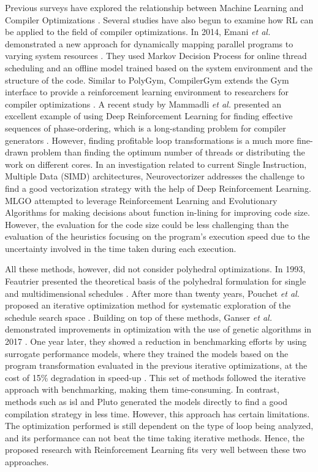 \documentclass[logo,msc]{infthesis}           %
\begin{document}
Previous surveys have explored the relationship between Machine Learning and Compiler Optimizations \cite{8357388}\cite{9232934}. Several studies have also begun to examine how RL can be applied to the field of compiler optimizations. In 2014, Emani \textit{et al.} demonstrated a new approach for dynamically mapping parallel programs to varying system resources \cite{10.1007}. They used Markov Decision Process for online thread scheduling and an offline model trained based on the system environment and the structure of the code. Similar to PolyGym, CompilerGym extends the Gym interface to provide a reinforcement learning environment to researchers for compiler optimizations \cite{CompilerGym}. A recent study by Mammadli \textit{et al.} presented an excellent example of using Deep Reinforcement Learning for finding effective sequences of phase-ordering, which is a long-standing problem for compiler generators \cite{static.neural}. However, finding profitable loop transformations is a much more fine-drawn problem than finding the optimum number of threads or distributing the work on different cores. In an investigation related to current Single Instruction, Multiple Data (SIMD) architectures, Neurovectorizer \cite{NeuroVectorizer} addresses the challenge to find a good vectorization strategy with the help of Deep Reinforcement Learning. MLGO \cite{10.48550} attempted to leverage Reinforcement Learning and Evolutionary Algorithms for making decisions about function in-lining for improving code size. However, the evaluation for the code size could be less challenging than the evaluation of the heuristics focusing on the program's execution speed due to the uncertainty involved in the time taken during each execution.

All these methods, however, did not consider polyhedral optimizations. In 1993, Feautrier presented the theoretical basis of the polyhedral formulation for single and multidimensional schedules \cite{single}\cite{multi}. After more than twenty years, Pouchet \textit{et al.} proposed an iterative optimization method for systematic exploration of the schedule search space \cite{it_Single}\cite{it_multi}. Building on top of these methods, Ganser \textit{et al.} demonstrated improvements in optimization with the use of genetic algorithms in 2017 \cite{10.1145/3109482}. One year later, they showed a reduction in benchmarking efforts by using surrogate performance models, where they trained the models based on the program transformation evaluated in the previous iterative optimizations, at the cost of 15\% degradation in speed-up \cite{10.1145/3291773}. This set of methods followed the iterative approach with benchmarking, making them time-consuming. In contrast, methods such as isl\cite{isl} and Pluto\cite{Bondhugula07pluto:a} generated the models directly to find a good compilation strategy in less time. However, this approach has certain limitations. The optimization performed is still dependent on the type of loop being analyzed, and its performance can not beat the time taking iterative methods. Hence, the proposed research with Reinforcement Learning fits very well between these two approaches.
\end{document}
